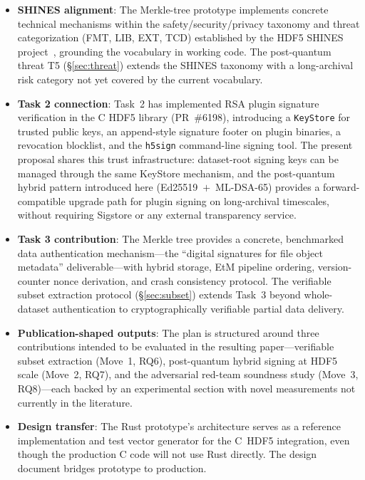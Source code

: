 \documentclass[11pt]{article}
\begin{document}
\begin{itemize}[nosep]
  \item \textbf{SHINES alignment}: The Merkle-tree prototype implements
    concrete technical mechanisms within the safety/security/privacy taxonomy
    and threat categorization (FMT, LIB, EXT, TCD) established by the HDF5
    SHINES project~\cite{shines}, grounding the vocabulary in working code.
    The post-quantum threat T5 (\S\ref{sec:threat}) extends the SHINES
    taxonomy with a long-archival risk category not yet covered by the
    current vocabulary.
  \item \textbf{Task 2 connection}: Task~2 has implemented RSA plugin
    signature verification in the C HDF5 library (PR~\#6198), introducing a
    \texttt{KeyStore} for trusted public keys, an append-style signature footer
    on plugin binaries, a revocation blocklist, and the \texttt{h5sign}
    command-line signing tool.  The present proposal shares this trust
    infrastructure: dataset-root signing keys can be managed through the same
    KeyStore mechanism, and the post-quantum hybrid pattern introduced here
    (Ed25519~$+$~ML-DSA-65) provides a forward-compatible upgrade path for
    plugin signing on long-archival timescales, without requiring Sigstore
    or any external transparency service.
  \item \textbf{Task 3 contribution}: The Merkle tree provides a concrete,
    benchmarked data authentication mechanism---the ``digital signatures for
    file object metadata'' deliverable---with hybrid storage, EtM pipeline
    ordering, version-counter nonce derivation, and crash consistency
    protocol. The verifiable subset extraction protocol
    (\S\ref{sec:subset}) extends Task~3 beyond whole-dataset authentication
    to cryptographically verifiable partial data delivery.
  \item \textbf{Publication-shaped outputs}: The plan is structured around
    three contributions intended to be evaluated in the resulting
    paper---verifiable subset extraction (Move~1, RQ6), post-quantum hybrid
    signing at HDF5 scale (Move~2, RQ7), and the adversarial red-team
    soundness study (Move~3, RQ8)---each backed by an experimental section
    with novel measurements not currently in the literature.
  \item \textbf{Design transfer}: The Rust prototype's architecture serves as a
    reference implementation and test vector generator for the C~HDF5
    integration, even though the production C code will not use Rust directly.
    The design document bridges prototype to production.
\end{itemize}
\end{document}
